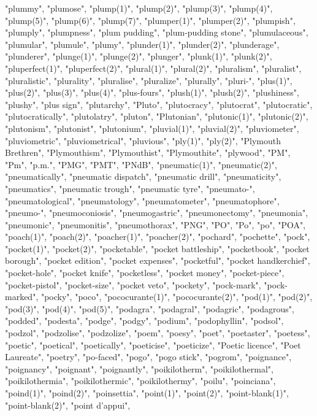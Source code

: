 "plummy",
"plumose",
"plump(1)",
"plump(2)",
"plump(3)",
"plump(4)",
"plump(5)",
"plump(6)",
"plump(7)",
"plumper(1)",
"plumper(2)",
"plumpish",
"plumply",
"plumpness",
"plum pudding",
"plum-pudding stone",
"plumulaceous",
"plumular",
"plumule",
"plumy",
"plunder(1)",
"plunder(2)",
"plunderage",
"plunderer",
"plunge(1)",
"plunge(2)",
"plunger",
"plunk(1)",
"plunk(2)",
"pluperfect(1)",
"pluperfect(2)",
"plural(1)",
"plural(2)",
"pluralism",
"pluralist",
"pluralistic",
"plurality",
"pluralise",
"pluralize",
"plurally",
"pluri-",
"plus(1)",
"plus(2)",
"plus(3)",
"plus(4)",
"plus-fours",
"plush(1)",
"plush(2)",
"plushiness",
"plushy",
"plus sign",
"plutarchy",
"Pluto",
"plutocracy",
"plutocrat",
"plutocratic",
"plutocratically",
"plutolatry",
"pluton",
"Plutonian",
"plutonic(1)",
"plutonic(2)",
"plutonism",
"plutonist",
"plutonium",
"pluvial(1)",
"pluvial(2)",
"pluviometer",
"pluviometric",
"pluviometrical",
"pluvious",
"ply(1)",
"ply(2)",
"Plymouth Brethren",
"Plymouthism",
"Plymouthist",
"Plymouthite",
"plywood",
"PM",
"Pm",
"p.m.",
"PMG",
"PMT",
"PNdB",
"pneumatic(1)",
"pneumatic(2)",
"pneumatically",
"pneumatic dispatch",
"pneumatic drill",
"pneumaticity",
"pneumatics",
"pneumatic trough",
"pneumatic tyre",
"pneumato-",
"pneumatological",
"pneumatology",
"pneumatometer",
"pneumatophore",
"pneumo-",
"pneumoconiosis",
"pneumogastric",
"pneumonectomy",
"pneumonia",
"pneumonic",
"pneumonitis",
"pneumothorax",
"PNG",
"PO",
"Po",
"po",
"POA",
"poach(1)",
"poach(2)",
"poacher(1)",
"poacher(2)",
"pochard",
"pochette",
"pock",
"pocket(1)",
"pocket(2)",
"pocketable",
"pocket battleship",
"pocketbook",
"pocket borough",
"pocket edition",
"pocket expenses",
"pocketful",
"pocket handkerchief",
"pocket-hole",
"pocket knife",
"pocketless",
"pocket money",
"pocket-piece",
"pocket-pistol",
"pocket-size",
"pocket veto",
"pockety",
"pock-mark",
"pock-marked",
"pocky",
"poco",
"pococurante(1)",
"pococurante(2)",
"pod(1)",
"pod(2)",
"pod(3)",
"pod(4)",
"pod(5)",
"podagra",
"podagral",
"podagric",
"podagrous",
"podded",
"podesta",
"podge",
"podgy",
"podium",
"podophyllin",
"podsol",
"podzol",
"podzolise",
"podzolize",
"poem",
"poesy",
"poet",
"poetaster",
"poetess",
"poetic",
"poetical",
"poetically",
"poeticise",
"poeticize",
"Poetic licence",
"Poet Laureate",
"poetry",
"po-faced",
"pogo",
"pogo stick",
"pogrom",
"poignance",
"poignancy",
"poignant",
"poignantly",
"poikilotherm",
"poikilothermal",
"poikilothermia",
"poikilothermic",
"poikilothermy",
"poilu",
"poinciana",
"poind(1)",
"poind(2)",
"poinsettia",
"point(1)",
"point(2)",
"point-blank(1)",
"point-blank(2)",
"point d'appui",
